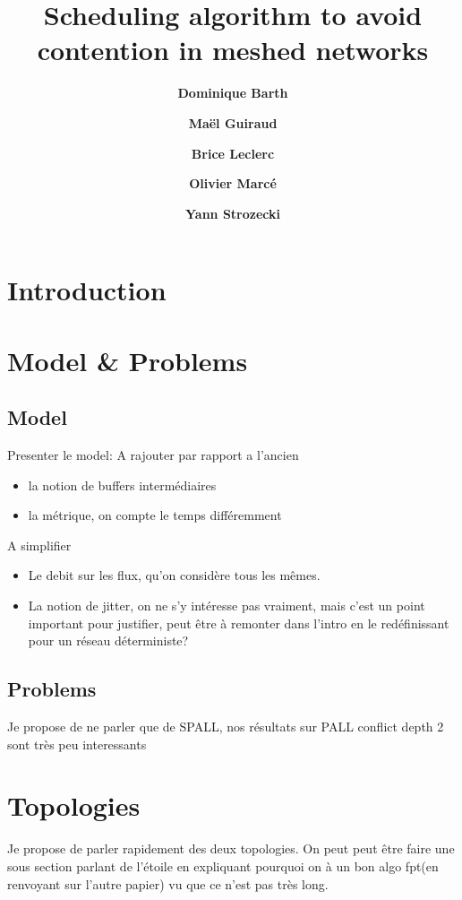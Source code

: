 \documentclass{article}
\begin{document}
\title{Scheduling algorithm to avoid contention in meshed networks}
 

\newcommand{\todo}[1]{{\color{red} TODO: {#1}}}


\author[1]{\bf{ {Dominique Barth}}}
\author[1,2]{\bf{ {Ma\"el Guiraud}}}
\author[2]{\bf{ {Brice Leclerc}}}
\author[2]{\bf{ {Olivier Marc\'e}}}
\author[1]{\bf{ {Yann Strozecki}}}




\maketitle

\section*{Introduction}
\section{Model \& Problems}
\subsection{Model}
Presenter le model: 
A rajouter par rapport a l'ancien\begin{itemize}
\item la notion de buffers intermédiaires
\item la métrique, on compte le temps différemment 
\end{itemize}
A simplifier \begin{itemize}
\item Le debit sur les flux, qu'on considère tous les mêmes.
\item La notion de jitter, on ne s'y intéresse pas vraiment, mais c'est un point important pour justifier, peut être à remonter dans l'intro en le redéfinissant pour un réseau déterministe?
\end{itemize} 
\subsection{Problems}
Je propose de ne parler que de SPALL, nos résultats sur PALL conflict depth 2 sont très peu interessants

\section{Topologies}
Je propose de parler rapidement des deux topologies. On peut peut être faire une sous section parlant de l'étoile en expliquant pourquoi on à un bon algo fpt(en renvoyant sur l'autre papier) vu que ce n'est pas très long.
\end{document}
